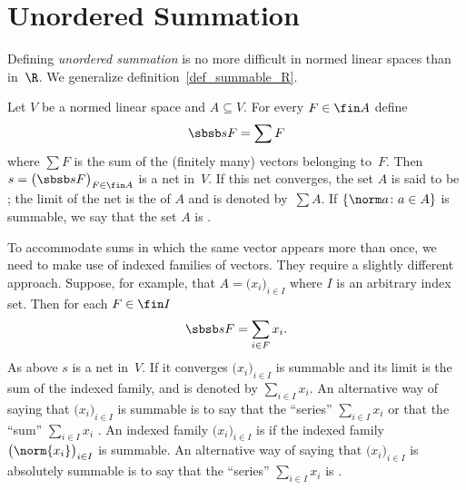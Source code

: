 \section{Unordered Summation}

Defining \emph{unordered summation} is no more difficult in normed linear spaces than in~$\R$.  We generalize
definition~\ref{def_summable_R}.

\begin{defn} Let $V$ be a normed linear space and $A \subseteq V$.
For every $F \in \fin A$ define
  \[ \sbsb sF = \sum F\]
where $\sum F$ is the sum of the (finitely many) vectors belonging to~$F$.
Then $s = \bigl(\sbsb sF\bigr)_{F \in \fin A}$ is a net in~$V$. If this net converges, the set
$A$ is said to be
; the limit of the net is the
 of $A$ and is denoted by~$\sum A$. If $\{\norm a\colon a \in A\}$ is summable, we say that the set $A$ is
.

To accommodate sums in which the same vector appears more than once, we need to make use of indexed families of vectors.  They
require a slightly different approach. Suppose, for example, that $A = \bigl(x_i\bigr)_{i \in I}$ where $I$ is
an arbitrary index set. Then for each $F \in \fin I$
  \[ \sbsb sF = \sum_{i \in F}x_i . \]
As above $s$ is a net in~$V$. If it converges $\bigl(x_i\bigr)_{i \in I}$ is
summable and its limit is the
sum of the indexed family, and is denoted by $\sum_{i \in I} x_i$.  An alternative way of saying that $\bigl(x_i\bigr)_{i \in I}$
is summable is to say that the ``series'' $\sum_{i \in I}x_i$
 or that the ``sum'' $\sum_{i \in I}x_i$ .  An indexed family $\bigl(x_i\bigr)_{i \in I}$ is
 if the indexed family $\bigl(\norm{x_i}\bigr)_{i \in I}$ is summable.  An alternative way of saying
that $\bigl(x_i\bigr)_{i \in I}$ is absolutely summable is to say that the ``series'' $\sum_{i \in I}x_i$ is
.


\end{defn}
